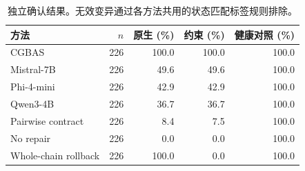 \begin{table}[t]
\centering
\small
\caption{独立确认结果。无效变异通过各方法共用的状态匹配标签规则排除。}
\begin{tabular}{lrrrr}
\toprule
方法 & $n$ & 原生 (\%) & 约束 (\%) & 健康对照 (\%) \\
\midrule
CGBAS & 226 & 100.0 & 100.0 & 100.0 \\
Mistral-7B & 226 & 49.6 & 49.6 & 100.0 \\
Phi-4-mini & 226 & 42.9 & 42.9 & 100.0 \\
Qwen3-4B & 226 & 36.7 & 36.7 & 100.0 \\
Pairwise contract & 226 & 8.4 & 7.5 & 100.0 \\
No repair & 226 & 0.0 & 0.0 & 100.0 \\
Whole-chain rollback & 226 & 100.0 & 0.0 & 100.0 \\
\bottomrule
\end{tabular}
\end{table}
